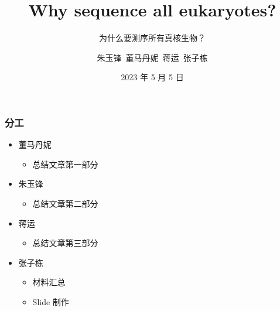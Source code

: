 \documentclass{beamer}
\author[朱玉锋~董马丹妮~蒋运~张子栋]{朱玉锋~董马丹妮~蒋运~张子栋}
\title[Why sequence all eukaryotes?]{Why sequence all eukaryotes?}
\subtitle{为什么要测序所有真核生物？}
\institute[Group 7]{华中农业大学
	
	信息学院}
\date[2023 年 5 月 5 日]{2023 年 5 月 5 日}
\begin{document}
	\kaishu
	
	\frame{\titlepage}


	\begin{frame}
		\frametitle{分工}
	
		\begin{itemize}
			\item 董马丹妮
			\begin{itemize}
				\item 总结文章第一部分
			\end{itemize}
			
			\item 朱玉锋
			\begin{itemize}
				\item 总结文章第二部分
			\end{itemize}
			
			\item 蒋运
			\begin{itemize}
				\item 总结文章第三部分
			\end{itemize}
			
			\item 张子栋
			\begin{itemize}
				\item 材料汇总
				\item Slide 制作
			\end{itemize}
		\end{itemize}
		
	\end{frame}


\begin{frame}
	\tableofcontents
\end{frame}

	
\end{document}
